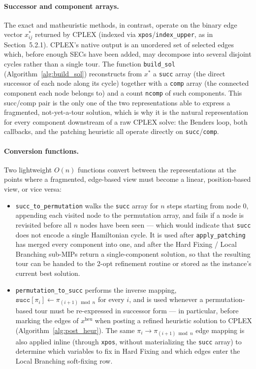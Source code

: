 \documentclass{article}
\begin{document}
\paragraph{Successor and component arrays.}
The exact and matheuristic methods, in contrast, operate on the binary edge vector $x^*_{ij}$
returned by CPLEX (indexed via \texttt{xpos}/\texttt{index\_upper}, as in
Section~5.2.1). CPLEX's native output is an unordered set of selected edges which, before
enough SECs have been added, may decompose into several disjoint cycles rather than a single
tour. The function \texttt{build\_sol} (Algorithm~\ref{alg:build_sol}) reconstructs from
$x^*$ a \texttt{succ} array (the direct successor of each node along its cycle) together with
a \texttt{comp} array (the connected component each node belongs to) and a count
\texttt{ncomp} of such components. This succ/comp pair is the only one of the two
representations able to express a fragmented, not-yet-a-tour solution, which is why it is the
natural representation for every component downstream of a raw CPLEX solve: the Benders loop,
both callbacks, and the patching heuristic all operate directly on \texttt{succ}/\texttt{comp}.

\paragraph{Conversion functions.}
Two lightweight $O(n)$ functions convert between the representations at the points where a
fragmented, edge-based view must become a linear, position-based view, or vice versa:

\begin{itemize}
    \item \texttt{succ\_to\_permutation} walks the \texttt{succ} array for $n$ steps starting
          from node $0$, appending each visited node to the permutation array, and fails if a
          node is revisited before all $n$ nodes have been seen --- which would indicate that
          \texttt{succ} does not encode a single Hamiltonian cycle. It is used after
          \texttt{apply\_patching} has merged every component into one, and after the Hard
          Fixing / Local Branching sub-MIPs return a single-component solution, so that the
          resulting tour can be handed to the 2-opt refinement routine or stored as the
          instance's current best solution.
    \item \texttt{permutation\_to\_succ} performs the inverse mapping,
          $\texttt{succ}[\pi_i] \leftarrow \pi_{(i+1) \bmod n}$ for every $i$, and is used
          whenever a permutation-based tour must be re-expressed in successor form --- in
          particular, before marking the edges of $x^{\text{heu}}$ when posting a refined
          heuristic solution to CPLEX (Algorithm~\ref{alg:post_heur}). The same
          $\pi_i \rightarrow \pi_{(i+1) \bmod n}$ edge mapping is also applied inline (through
          \texttt{xpos}, without materializing the \texttt{succ} array) to determine which
          variables to fix in Hard Fixing and which edges enter the Local Branching
          soft-fixing row.
\end{itemize}
\end{document}
